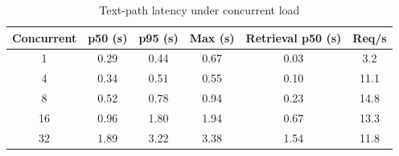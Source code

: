 \begin{table}[!htbp]
\centering
\caption{Text-path latency under concurrent load}
\label{tab:sup_load}
\small
\begin{tabular}{cccccc}
\toprule
\textbf{Concurrent} & \textbf{p50 (s)} & \textbf{p95 (s)} & \textbf{Max (s)} & \textbf{Retrieval p50 (s)} & \textbf{Req/s} \\
\midrule
1 & 0.29 & 0.44 & 0.67 & 0.03 & 3.2 \\
4 & 0.34 & 0.51 & 0.55 & 0.10 & 11.1 \\
8 & 0.52 & 0.78 & 0.94 & 0.23 & 14.8 \\
16 & 0.96 & 1.80 & 1.94 & 0.67 & 13.3 \\
32 & 1.89 & 3.22 & 3.38 & 1.54 & 11.8 \\
\bottomrule
\end{tabular}
\end{table}
